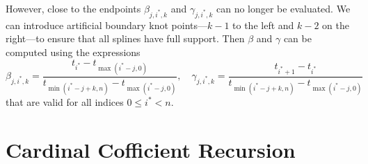 However, close to the endpoints $\beta_{j, i^*, k}$ and $\gamma_{j, i^*, k}$ can no longer be evaluated. We can introduce artificial boundary knot points---$k-1$ to the left and $k-2$ on the right---to ensure that all splines have full support. Then $\beta$ and $\gamma$ can be computed using the expressions
\begin{equation}
  \label{eq:beta_capped}
  \beta_{j, i^*, k} = \frac{t_{i^*} - t_{\max(i^* - j, 0)}}{t_{\min(i^* - j + k, n)} - t_{\max(i^* - j, 0)}}, \quad \gamma_{j, i^*, k} = \frac{t_{i^*+1} - t_{i^*}}{t_{\min(i^* - j + k, n)} - t_{\max(i^* - j, 0)}}
\end{equation}
that are valid for all indices $0 \leq i^* < n$.

\section{Cardinal Cofficient Recursion}


